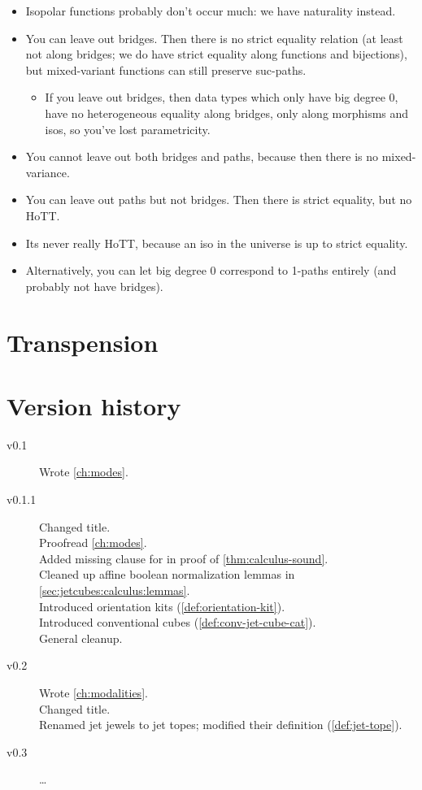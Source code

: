 \documentclass[a4paper]{memoir}
\begin{document}
{\begin{itemize}
	This is an argument to have both bridges and paths.
	\item Isopolar functions probably don't occur much: we have naturality instead.
	\item You can leave out bridges. Then there is no strict equality relation (at least not along bridges; we do have strict equality along functions and bijections), but mixed-variant functions can still preserve suc-paths.
	\begin{itemize}
		\item If you leave out bridges, then data types which only have big degree 0, have no heterogeneous equality along bridges, only along morphisms and isos, so you've lost parametricity.
	\end{itemize}
	\item You cannot leave out both bridges and paths, because then there is no mixed-variance.
	\item You can leave out paths but not bridges. Then there is strict equality, but no HoTT.
	\item Its never really HoTT, because an iso in the universe is up to strict equality.
	\item Alternatively, you can let big degree 0 correspond to 1-paths entirely (and probably not have bridges).
\end{itemize}
}

\chapter{Transpension}

\appendix
\chapter{Version history}
\begin{description}
	\item[v0.1] Wrote \cref{ch:modes}.
	\item[v0.1.1] Changed title. \\
		Proofread \cref{ch:modes}. \\
		Added missing clause for  in proof of \cref{thm:calculus-sound}. \\
		Cleaned up affine boolean normalization lemmas in \cref{sec:jetcubes:calculus:lemmas}. \\
		Introduced orientation kits (\cref{def:orientation-kit}). \\
		Introduced conventional cubes (\cref{def:conv-jet-cube-cat}). \\
		General cleanup.
	\item[v0.2] Wrote \cref{ch:modalities}. \\
		Changed title. \\
		Renamed jet jewels to jet topes; modified their definition (\cref{def:jet-tope}).
	\item[v0.3] \ldots
\end{description}



\end{document}
